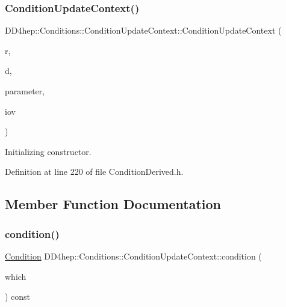 \subsubsection{\texorpdfstring{Condition\+Update\+Context()}{ConditionUpdateContext()}}
{\footnotesize\ttfamily D\+D4hep\+::\+Conditions\+::\+Condition\+Update\+Context\+::\+Condition\+Update\+Context (\begin{DoxyParamCaption}\item[{const \hyperlink{class_d_d4hep_1_1_conditions_1_1_condition_resolver}{Condition\+Resolver} \&}]{r,  }\item[{const \hyperlink{class_d_d4hep_1_1_conditions_1_1_condition_dependency}{Condition\+Dependency} \&}]{d,  }\item[{void $\ast$}]{parameter,  }\item[{\hyperlink{class_d_d4hep_1_1_conditions_1_1_condition_ad84300e226b2085ec5e9db7f47be5539}{Condition\+::iov\+\_\+type} \&}]{iov }\end{DoxyParamCaption})\hspace{0.3cm}{\ttfamily [inline]}}



Initializing constructor. 



Definition at line 220 of file Condition\+Derived.\+h.



\subsection{Member Function Documentation}
\hypertarget{class_d_d4hep_1_1_conditions_1_1_condition_update_context_a5e1a9f1553a22cf6d595b77d6a5519ad}{}\label{class_d_d4hep_1_1_conditions_1_1_condition_update_context_a5e1a9f1553a22cf6d595b77d6a5519ad} 
\subsubsection{\texorpdfstring{condition()}{condition()}\hspace{0.1cm}{\footnotesize\ttfamily [1/2]}}
{\footnotesize\ttfamily \hyperlink{class_d_d4hep_1_1_conditions_1_1_condition}{Condition} D\+D4hep\+::\+Conditions\+::\+Condition\+Update\+Context\+::condition (\begin{DoxyParamCaption}\item[{size\+\_\+t}]{which }\end{DoxyParamCaption}) const\hspace{0.3cm}{\ttfamily [inline]}}




